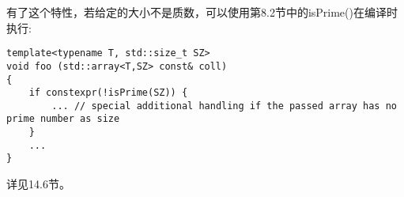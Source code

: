 有了这个特性，若给定的大小不是质数，可以使用第8.2节中的isPrime()在编译时执行:

\begin{lstlisting}[style=styleCXX]
template<typename T, std::size_t SZ>
void foo (std::array<T,SZ> const& coll)
{
	if constexpr(!isPrime(SZ)) {
		... // special additional handling if the passed array has no prime number as size
	}
	...
}
\end{lstlisting}

详见14.6节。



























